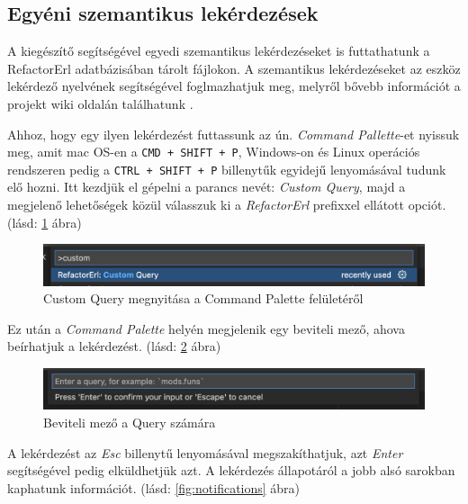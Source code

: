 \subsection{Egyéni szemantikus lekérdezések}
A kiegészítő segítségével egyedi szemantikus lekérdezéseket is futtathatunk a RefactorErl adatbázisában tárolt fájlokon. A szemantikus lekérdezéseket az eszköz lekérdező nyelvének segítségével foglmazhatjuk meg, melyről bővebb információt a projekt wiki oldalán találhatunk \cite{referlWikiSemanticQuery}. \cite{actaelect11}

Ahhoz, hogy egy ilyen lekérdezést futtassunk az ún. \textit{Command Pallette}-et nyissuk meg, amit mac OS-en a \lstinline{CMD + SHIFT + P}, Windows-on és Linux operációs rendszeren pedig a \lstinline{CTRL + SHIFT + P} billenytűk egyidejű lenyomásával tudunk elő hozni. Itt kezdjük el gépelni a parancs nevét: \textit{Custom Query}, majd a megjelenő lehetőségek közül válasszuk ki a \textit{RefactorErl} prefixxel ellátott opciót. (lásd: \ref{fig:custom_query_palette} ábra)
\begin{figure}[H]
  \centering
  \includegraphics[width=\linewidth]{images/custom_query_palette.png}
  \caption{Custom Query megnyitása a Command Palette felületéről}
  \label{fig:custom_query_palette}
\end{figure}

Ez után a \textit{Command Palette} helyén megjelenik egy beviteli mező, ahova beírhatjuk a lekérdezést. (lásd: \ref{fig:custom_query_input} ábra)

\begin{figure}[H]
  \centering
  \includegraphics[width=\linewidth]{images/custom_query_input.png}
  \caption{Beviteli mező a Query számára}
  \label{fig:custom_query_input}
\end{figure}

A lekérdezést az \textit{Esc} billenytű lenyomásával megszakíthatjuk, azt \textit{Enter} segítségével pedig elküldhetjük azt. A lekérdezés állapotáról a jobb alsó sarokban kaphatunk információt. (lásd: \ref{fig:notifications} ábra)


